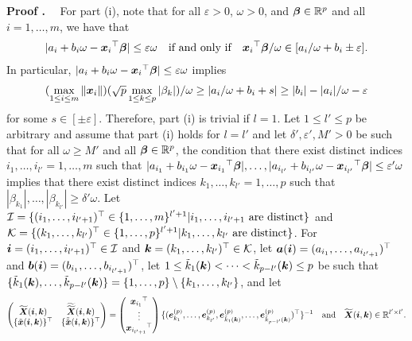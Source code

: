 \documentclass[12pt]{article}
\def\ep{{\varepsilon}}
\def\be{{\beta}}
\def\de{{\delta}}
\def\ep{{\varepsilon}}
\def\om{{\omega}}
\def\non{{\nonumber}}
\def\Ic{{\cal I}}
\def\Kc{{\cal K}}
\def\be{{\beta}}
\def\de{{\delta}}
\def\ep{{\varepsilon}}
\def\om{{\omega}}
\def\bbe{{\text{\boldmath $\beta$}}}
\def\a{{\text{\boldmath $a$}}}
\def\b{{\text{\boldmath $b$}}}
\def\e{{\text{\boldmath $e$}}}
\def\i{{\text{\boldmath $i$}}}
\def\k{{\text{\boldmath $k$}}}
\def\x{{\text{\boldmath $x$}}}
\def\X{{\text{\boldmath $X$}}}
\def\xbt{{\tilde \x}}
\def\kt{{\tilde k}}
\def\Xbt{{\widetilde \X}}
\def\Ic{{\cal I}}
\def\Kc{{\cal K}}
\def\non{{\nonumber}}
\begin{document}
\noindent
{\bf Proof%
.} \ \ For part (i), note that for all $\ep > 0$, $\om > 0$, and $\bbe \in \mathbb{R} ^p$ and all $i = 1, \dots , m$, we have that 
\begin{align}
| a_i + b_i \om - {\x _i}^{\top } \bbe | \le \ep \om \quad \text{if and only if} \quad {\x _i}^{\top } \bbe / \om \in [ a_i / \om + b_i \pm \ep ] \text{.} \non 
\end{align}
In particular, $| a_i + b_i \om - {\x _i}^{\top } \bbe | \le \ep \om $ implies 
\begin{align}
( \max_{1 \le i \le m} \| \x _i \| ) ( \sqrt{p} \max_{1 \le k \le p} | \be _k |) / \om \ge |  a_i / \om + b_i + s| \ge | b_i | - | a_i | / \om - \ep \non 
\end{align}
for some $s \in [ \pm \ep ]$. 
Therefore, part (i) is trivial if $l = 1$. 
Let $1 \le l' \le p$ be arbitrary and assume that part (i) holds for $l = l'$ and let ${\de }' , {\ep }' , M' > 0$ be such that for all $\om \ge M'$ and all $\bbe \in \mathbb{R} ^p$, the condition that there exist distinct indices $i_1 , \dots , i_{l'} = 1, \dots , m$ such that $| a_{i_1} + b_{i_1} \om - {\x _{i_1}}^{\top } \bbe |, \dots , | a_{i_{l'}} + b_{i_{l'}} \om - {\x _{i_{l'}}}^{\top } \bbe | \le {\ep }' \om $ implies that there exist distinct indices $k_1 , \dots , k_{l'} = 1, \dots , p$ such that $| \be _{k_1} |, \dots , | \be _{k_{l'}} | \ge {\de }' \om $. 
Let $\Ic = \{ ( i_1 , \dots , i_{l' + 1} )^{\top } \in \{ 1, \dots , m \} ^{l' + 1} | \text{$i_1 , \dots , i_{l' + 1}$ are distinct} \} $ and $\Kc = \{ ( k_1 , \dots , k_{l'} )^{\top } \in \{ 1, \dots , p \} ^{l' + 1} | \text{$k_1 , \dots , k_{l'}$ are distinct} \} $. 
For $\i = ( i_1 , \dots , i_{l' + 1} )^{\top } \in \Ic $ and $\k =  ( k_1 , \dots , k_{l'} )^{\top } \in \Kc $, let $\a ( \i ) = ( a_{i_1} , \dots , a_{i_{l' + 1}} )^{\top }$ and $\b ( \i ) = ( b_{i_1} , \dots , b_{i_{l' + 1}} )^{\top }$, let $1 \le \kt _1 ( \k ) < \dots < \kt _{p - l'} ( \k ) \le p$ be such that $\{ \kt _1 ( \k ) , \dots , \kt _{p - l'} ( \k ) \} = \{ 1, \dots , p \} \setminus \{ k_1 , \dots , k_{l'} \} $, and let 
\begin{align}
\begin{pmatrix} \Xbt ( \i , \k ) & \widetilde{\Xbt } ( \i , \k ) \\ \{ \xbt ( \i , \k ) \} ^{\top } & \{ \tilde{\xbt } ( \i , \k ) \} ^{\top } \end{pmatrix} = \begin{pmatrix} {\x _{i_1}}^{\top } \\ \vdots \\ {\x _{i_{l' + 1}}}^{\top } \end{pmatrix}  \{ ( \e _{k_1}^{(p)} , \dots ,  \e _{k_{l'}}^{(p)} ,  \e _{\kt _1 ( \k )}^{(p)} , \dots ,  \e _{\kt _{p - l'} ( \k )}^{(p)} )^{\top } \} ^{- 1} \quad \text{and} \quad \Xbt ( \i , \k ) \in \mathbb{R} ^{l' \times l'} \text{.} \non 
\end{align}
\end{document}
